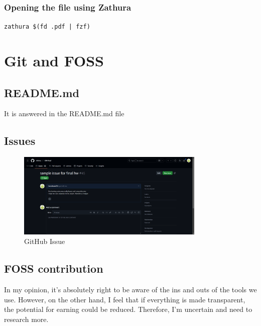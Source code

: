 \documentclass{article}
\begin{document}
        \subsubsection{Opening the file using Zathura}
            \hspace*{1cm} \texttt{zathura \$(fd .pdf | fzf)}

\section{Git and FOSS}
    \subsection{README.md}
        It is answered in the README.md file
        
    \subsection{Issues}
        \begin{figure}[h]
            \centering
            \includegraphics[width=0.8\textwidth]{hi.png}
            \caption{GitHub Issue}
        \end{figure}
        
    \subsection{FOSS contribution}
        In my opinion, it's absolutely right to be aware of the ins and outs of the tools we use. However, on the other hand, I feel that if everything is made transparent, the potential for earning could be reduced. Therefore, I'm uncertain and need to research more.
\end{document}
